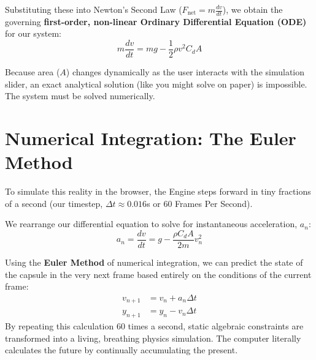 \documentclass[12pt]{article}
\begin{document}
Substituting these into Newton's Second Law ($F_{\text{net}} = m \frac{dv}{dt}$), we obtain the governing \textbf{first-order, non-linear Ordinary Differential Equation (ODE)} for our system:
\begin{equation}
    m \frac{dv}{dt} = mg - \frac{1}{2} \rho v^2 C_d A
\end{equation}

Because area ($A$) changes dynamically as the user interacts with the simulation slider, an exact analytical solution (like you might solve on paper) is impossible. The system must be solved numerically.

\section{Numerical Integration: The Euler Method}
To simulate this reality in the browser, the Engine steps forward in tiny fractions of a second (our timestep, $\Delta t \approx 0.016$s or 60 Frames Per Second). 

We rearrange our differential equation to solve for instantaneous acceleration, $a_n$:
\begin{equation}
    a_n = \frac{dv}{dt} = g - \frac{\rho C_d A}{2m} v_n^2
\end{equation}

Using the \textbf{Euler Method} of numerical integration, we can predict the state of the capsule in the very next frame based entirely on the conditions of the current frame:
\begin{align}
    v_{n+1} &= v_n + a_n \Delta t \\
    y_{n+1} &= y_n - v_n \Delta t
\end{align}
By repeating this calculation 60 times a second, static algebraic constraints are transformed into a living, breathing physics simulation. The computer literally calculates the future by continually accumulating the present.
\end{document}
